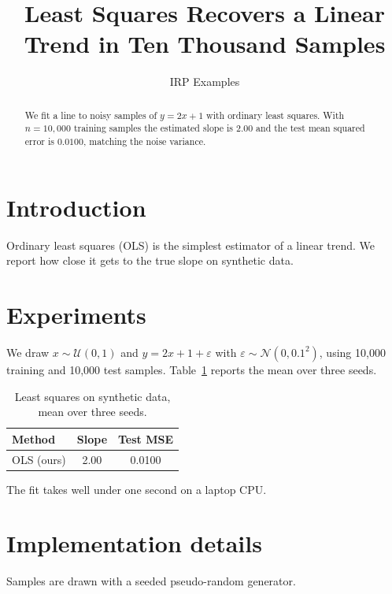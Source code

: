 \documentclass{article}
\title{Least Squares Recovers a Linear Trend in Ten Thousand Samples}
\author{IRP Examples}
\begin{document}
\maketitle

\begin{abstract}
We fit a line to noisy samples of $y = 2x + 1$ with ordinary least squares.
With $n = 10{,}000$ training samples the estimated slope is $2.00$ and the
test mean squared error is $0.0100$, matching the noise variance.
\end{abstract}

\section{Introduction}
\label{sec:intro}
Ordinary least squares (OLS) is the simplest estimator of a linear trend. We
report how close it gets to the true slope on synthetic data.



\section{Experiments}
\label{sec:experiments}
We draw $x \sim \mathcal{U}(0, 1)$ and $y = 2x + 1 + \varepsilon$ with
$\varepsilon \sim \mathcal{N}(0, 0.1^2)$, using 10{,}000 training and 10{,}000
test samples. Table~\ref{tab:main} reports the mean over three seeds.

\begin{table}[t]
\centering
\caption{Least squares on synthetic data, mean over three seeds.}
\label{tab:main}
\begin{tabular}{lcc}
\hline
Method & Slope & Test MSE \\
\hline
OLS (ours) & 2.00 & 0.0100 \\
\hline
\end{tabular}
\end{table}

The fit takes well under one second on a laptop CPU.

\appendix
\section{Implementation details}
\label{app:details}
Samples are drawn with a seeded pseudo-random generator.
\end{document}

